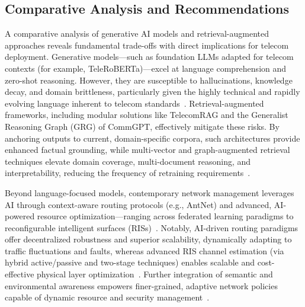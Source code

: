 \subsection{Comparative Analysis and Recommendations}

A comparative analysis of generative AI models and retrieval-augmented approaches reveals fundamental trade-offs with direct implications for telecom deployment. Generative models—such as foundation LLMs adapted for telecom contexts (for example, TeleRoBERTa)—excel at language comprehension and zero-shot reasoning. However, they are susceptible to hallucinations, knowledge decay, and domain brittleness, particularly given the highly technical and rapidly evolving language inherent to telecom standards~\cite{ref7, ref16, ref20}. Retrieval-augmented frameworks, including modular solutions like TelecomRAG and the Generalist Reasoning Graph (GRG) of CommGPT, effectively mitigate these risks. By anchoring outputs to current, domain-specific corpora, such architectures provide enhanced factual grounding, while multi-vector and graph-augmented retrieval techniques elevate domain coverage, multi-document reasoning, and interpretability, reducing the frequency of retraining requirements~\cite{ref7, ref16}.

Beyond language-focused models, contemporary network management leverages AI through context-aware routing protocols (e.g., AntNet) and advanced, AI-powered resource optimization—ranging across federated learning paradigms to reconfigurable intelligent surfaces (RISs)~\cite{ref15, ref21, ref22, ref27}. Notably, AI-driven routing paradigms offer decentralized robustness and superior scalability, dynamically adapting to traffic fluctuations and faults, whereas advanced RIS channel estimation (via hybrid active/passive and two-stage techniques) enables scalable and cost-effective physical layer optimization~\cite{ref26, ref27}. Further integration of semantic and environmental awareness empowers finer-grained, adaptive network policies capable of dynamic resource and security management~\cite{ref15, ref20, ref21, ref28}.

